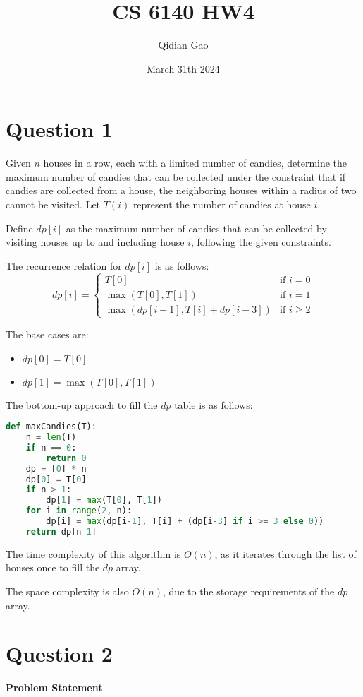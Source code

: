 \documentclass{article}
\title{CS 6140 HW4}
\author{Qidian Gao}
\date{March 31th 2024}
\begin{document}
\maketitle

\section{Question 1}
Given $n$ houses in a row, each with a limited number of candies, determine the maximum number of candies that can be collected under the constraint that if candies are collected from a house, the neighboring houses within a radius of two cannot be visited. Let $T(i)$ represent the number of candies at house $i$.

Define $dp[i]$ as the maximum number of candies that can be collected by visiting houses up to and including house $i$, following the given constraints.

The recurrence relation for $dp[i]$ is as follows:
\begin{equation}
dp[i] = 
\begin{cases} 
T[0] & \text{if } i = 0 \\
\max(T[0], T[1]) & \text{if } i = 1 \\
\max(dp[i-1], T[i] + dp[i-3]) & \text{if } i \geq 2
\end{cases}
\end{equation}

The base cases are:
\begin{itemize}
\item $dp[0] = T[0]$
\item $dp[1] = \max(T[0], T[1])$
\end{itemize}

The bottom-up approach to fill the $dp$ table is as follows:

\begin{lstlisting}[language=Python]
def maxCandies(T):
    n = len(T)
    if n == 0:
        return 0
    dp = [0] * n
    dp[0] = T[0]
    if n > 1:
        dp[1] = max(T[0], T[1])
    for i in range(2, n):
        dp[i] = max(dp[i-1], T[i] + (dp[i-3] if i >= 3 else 0))
    return dp[n-1]
\end{lstlisting}

The time complexity of this algorithm is $O(n)$, as it iterates through the list of houses once to fill the $dp$ array.

The space complexity is also $O(n)$, due to the storage requirements of the $dp$ array.
\section{Question 2}
\textbf{Problem Statement}
\end{document}
